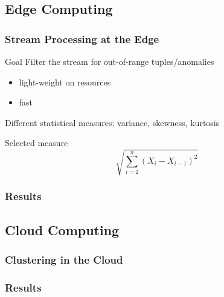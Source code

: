 \documentclass[xelatex,usenames,dvipsnames]{beamer}
\begin{document}
  \subsection{Edge Computing}
  \begin{frame}
    \frametitle{Stream Processing at the Edge}
  
    \alert{Goal} Filter the stream for out-of-range tuples/anomalies
    \begin{itemize}
      \item light-weight on resources
      \item fast
    \end{itemize}

    Different statistical measures: variance, skewness, kurtosis

      
      
      \begin{exampleblock}{Selected measure}
        \begin{equation*}
          \sqrt{\sum_{i=2}^{n}{(X_i - X_{i-1})^2}}
        \end{equation*}
      \end{exampleblock}
      
    
  \end{frame}


  \begin{frame}
    \frametitle{Results}
  
    
  
  \end{frame}


  \subsection{Cloud Computing}
  \begin{frame}
    \frametitle{Clustering in the Cloud}
  
    
  
  \end{frame}


  \begin{frame}
    \frametitle{Results}
  
    
  
  \end{frame}
\end{document}
